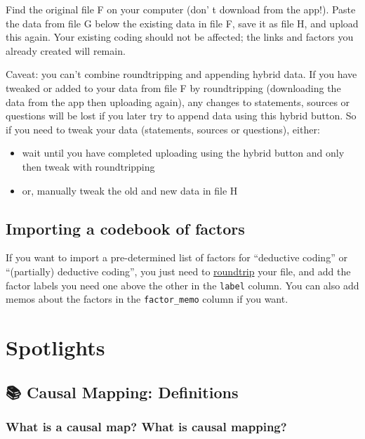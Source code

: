 \documentclass[
]{book}
\providecommand{\tightlist}{%
  \setlength{\itemsep}{0pt}\setlength{\parskip}{0pt}}
\begin{document}
Find the original file F on your computer (don' t download from the app!). Paste the data from file G below the existing data in file F, save it as file H, and upload this again. Your existing coding should not be affected; the links and factors you already created will remain.

Caveat: you can't combine roundtripping and appending hybrid data. If you have tweaked or added to your data from file F by roundtripping (downloading the data from the app then uploading again), any changes to statements, sources or questions will be lost if you later try to append data using this hybrid button. So if you need to tweak your data (statements, sources or questions), either:

\begin{itemize}
\tightlist
\item
  wait until you have completed uploading using the hybrid button and only then tweak with roundtripping
\item
  or, manually tweak the old and new data in file H
\end{itemize}

\hypertarget{importing-a-codebook-of-factors}{%
\chapter{Importing a codebook of factors}\label{importing-a-codebook-of-factors}}

If you want to import a pre-determined list of factors for ``deductive coding'' or ``(partially) deductive coding'', you just need to \protect\hyperlink{xroundtripping}{roundtrip} your file, and add the factor labels you need one above the other in the \texttt{label} column. You can also add memos about the factors in the \texttt{factor\_memo} column if you want.

\hypertarget{part-spotlights}{%
\part{Spotlights}\label{part-spotlights}}

\hypertarget{causal-mapping-definitions}{%
\chapter{📚 Causal Mapping: Definitions}\label{causal-mapping-definitions}}

\hypertarget{what-is-a-causal-map-what-is-causal-mapping}{%
\section{What is a causal map? What is causal mapping?}\label{what-is-a-causal-map-what-is-causal-mapping}}
\end{document}
